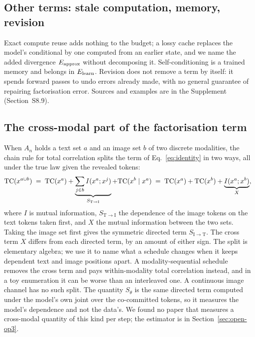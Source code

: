 \subsection{Other terms: stale computation, memory, revision}
\label{sec:budget-other}

Exact compute reuse adds nothing to the budget; a lossy cache replaces the model's conditional by one computed from an earlier state, and we name the added divergence $E_{\mathrm{approx}}$ without decomposing it. Self-conditioning is a trained memory and belongs in $E_{\mathrm{learn}}$. Revision does not remove a term by itself: it spends forward passes to undo errors already made, with no general guarantee of repairing factorisation error. Sources and examples are in the Supplement (Section~S8.9). %

\subsection{The cross-modal part of the factorisation term}
\label{sec:budget-crossmodal}

When $A_n$ holds a text set $a$ and an image set $b$ of two discrete modalities, the chain rule for total correlation splits the term of Eq.~\eqref{eq:identity} in two ways, all under the true law given the revealed tokens:
\begin{equation}
  \mathrm{TC}(x^{a\cup b})
  \;=\;\mathrm{TC}(x^a)+\underbrace{\sum_{j\in b}I(x^a;x^j)}_{S_{\mathrm T\to\mathrm I}}+\mathrm{TC}(x^b\mid x^a)
  \;=\;\mathrm{TC}(x^a)+\mathrm{TC}(x^b)+\underbrace{I(x^a;x^b)}_{X},
  \label{eq:crossmodal}
\end{equation}
where $I$ is mutual information, $S_{\mathrm T\to\mathrm I}$ the dependence of the image tokens on the text tokens taken first, and $X$ the mutual information between the two sets. Taking the image set first gives the symmetric directed term $S_{\mathrm I\to\mathrm T}$. The cross term $X$ differs from each directed term, by an amount of either sign. The split is elementary algebra; we use it to name what a schedule changes when it keeps dependent text and image positions apart. A modality-sequential schedule removes the cross term and pays within-modality total correlation instead, and in a toy enumeration it can be worse than an interleaved one. A continuous image channel has no such split. %
The quantity $S_\theta$ is the same directed term computed under the model's own joint over the co-committed tokens, so it measures the model's dependence and not the data's. We found no paper that measures a cross-modal quantity of this kind per step; the estimator is in Section~\ref{sec:open-op3}. %


